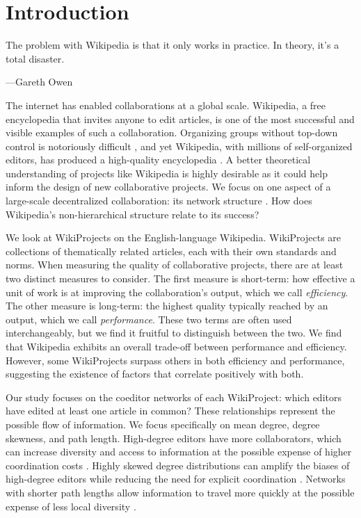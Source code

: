 \documentclass[letterpaper,twocolumn,10pt]{article}
\newcommand{\+}{\phantom{-}}
\begin{document}
\section{Introduction}
\epigraph
{The problem with Wikipedia is that it only works in practice. In theory, it's a total disaster.}
{---Gareth Owen \cite{elsharbaty_editing_2016} }

The internet has enabled collaborations at a global scale.
Wikipedia, a free encyclopedia that invites anyone to edit articles,
is one of the most successful and visible examples of such a collaboration.
Organizing groups without top-down control is notoriously
difficult
\cite{freeman_tyranny_1972},
and yet Wikipedia, with millions of self-organized editors,
has produced a high-quality encyclopedia \cite{giles_internet_2005,keegan_evolution_2017}.
A better theoretical understanding of projects like Wikipedia is highly desirable as it could
help inform the design of new collaborative projects.
We focus on one aspect of a large-scale decentralized collaboration:
its network structure \cite{newman_structure_2003}.
How does Wikipedia's non-hierarchical structure relate to its success?

We look at WikiProjects on the English-language Wikipedia.
WikiProjects are collections of thematically related articles,
each with their own standards and norms.
When measuring the quality of collaborative projects,
there are at least two distinct measures to consider.
The first measure is short-term:
how effective a unit of work is at improving
the collaboration's output,
which we call {\em efficiency}.
The other measure is long-term:
the highest quality typically reached by an output,
which we call {\em performance}.
These two terms are often used interchangeably,
but we find it fruitful to distinguish between the two.
We find that Wikipedia exhibits an overall trade-off between performance and efficiency.
However, some WikiProjects surpass others in both efficiency and performance,
suggesting the existence of factors that correlate positively with both.

Our study focuses on the coeditor networks of each WikiProject:
which editors have edited at least one article in common?
These relationships represent the possible flow of information.
We focus specifically on mean degree, degree skewness, and path length.
High-degree editors have more collaborators,
which can increase diversity and access to information at the possible
expense of higher coordination costs
\cite{hong_groups_2004,golub_naive_2010}.
Highly skewed degree distributions can amplify the biases of high-degree
editors while reducing the need for explicit coordination
\cite{kearns_experiments_2012}.
Networks with shorter path lengths allow information to travel more quickly
at the possible expense of less local diversity
\cite{mason_propagation_2008,barkoczi_social_2016}.
\end{document}
